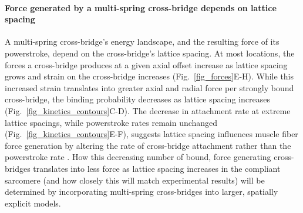 \documentclass[]{article}
\begin{document}
\paragraph{Force generated by a multi-spring cross-bridge depends on lattice spacing} %
A multi-spring cross-bridge's energy landscape, and the resulting force of its powerstroke, depend on the cross-bridge's lattice spacing.
At most locations, the forces a cross-bridge produces at a given axial offset increase as lattice spacing grows and strain on the cross-bridge increases (Fig.~\ref{fig_forces}E-H). 
While this increased strain translates into greater axial and radial force per strongly bound cross-bridge, the binding probability decreases as lattice spacing increases (Fig.~\ref{fig_kinetics_contours}C-D).
The decrease in attachment rate at extreme lattice spacings, while powerstroke rates remain unchanged (Fig.~\ref{fig_kinetics_contours}E-F), suggests lattice spacing influences muscle fiber force generation by altering the rate of cross-bridge attachment rather than the powerstroke rate \citep{Martyn2004}. 
How this decreasing number of bound, force generating cross-bridges translates into less force as lattice spacing increases in the compliant sarcomere (and how closely this will match experimental results) will be determined by incorporating multi-spring cross-bridges into larger, spatially explicit models. 
\end{document}
